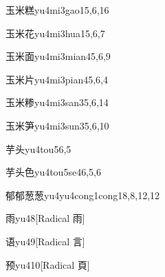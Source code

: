 \begin{verbete}{玉米糕}{yu4mi3gao1}{5,6,16}
\end{verbete}

\begin{verbete}{玉米花}{yu4mi3hua1}{5,6,7}
\end{verbete}

\begin{verbete}{玉米面}{yu4mi3mian4}{5,6,9}
\end{verbete}

\begin{verbete}{玉米片}{yu4mi3pian4}{5,6,4}
\end{verbete}

\begin{verbete}{玉米糁}{yu4mi3san3}{5,6,14}
\end{verbete}

\begin{verbete}{玉米笋}{yu4mi3sun3}{5,6,10}
\end{verbete}

\begin{verbete}{芋头}{yu4tou5}{6,5}
\end{verbete}

\begin{verbete}{芋头色}{yu4tou5se4}{6,5,6}
\end{verbete}

\begin{verbete}{郁郁葱葱}{yu4yu4cong1cong1}{8,8,12,12}
\end{verbete}

\begin{verbete}{雨}{yu4}{8}[Radical 雨]
\end{verbete}

\begin{verbete}{语}{yu4}{9}[Radical 言]
\end{verbete}

\begin{verbete}{预}{yu4}{10}[Radical 頁]
\end{verbete}

